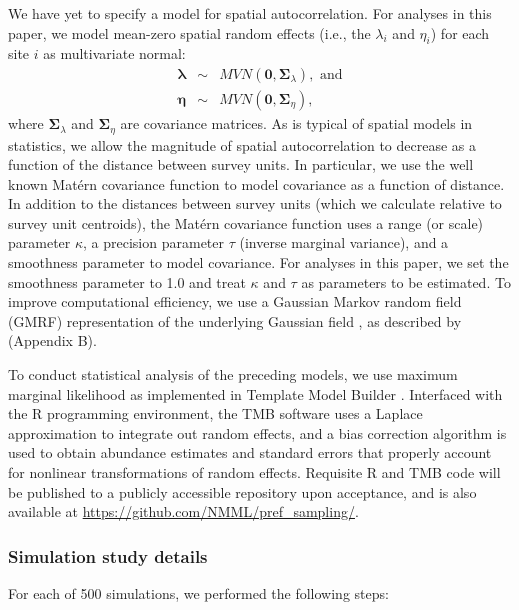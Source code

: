 \documentclass[times,mee,doublespace,]{besauth2}
\begin{document}
\begin{flushleft}
\hspace{0.5in} We have yet to specify a model for spatial autocorrelation.  For analyses in this paper, we model mean-zero spatial random effects (i.e., the $\lambda_i$ and $\eta_i$) for each site $i$ as multivariate normal:
\begin{eqnarray*}
  \boldsymbol{\lambda} & \sim & MVN(\textbf{0},\boldsymbol{\Sigma}_{\lambda}), \text{ and} \\
  \boldsymbol{\eta} & \sim & MVN(\textbf{0},\boldsymbol{\Sigma}_{\eta}),
\end{eqnarray*}
where $\boldsymbol{\Sigma}_{\lambda}$ and $\boldsymbol{\Sigma}_{\eta}$ are covariance matrices.  As is typical of spatial models in statistics, we allow the magnitude of spatial autocorrelation to decrease as a function of the distance between survey units.  In particular, we use the well known Mat\'{e}rn covariance function to model covariance as a function of distance.  In addition to the distances between survey units (which we calculate relative to survey unit centroids), the Mat\'{e}rn covariance function uses a range (or scale) parameter $\kappa$, a precision parameter $\tau$ (inverse marginal variance), and a smoothness parameter to model covariance.  For analyses in this paper, we set the smoothness parameter to 1.0 and treat $\kappa$ and $\tau$ as parameters to be estimated.  To improve computational efficiency, we use a Gaussian Markov random field (GMRF) representation of the underlying Gaussian field \citep{LindgrenEtAl2011}, as described by \citet{ThorsonEtAl2015} (Appendix B).  

To conduct statistical analysis of the preceding models, we use maximum marginal likelihood as implemented in Template Model Builder \citep[TMB; ][]{KristensenEtAl2015}. Interfaced with the R programming environment, the TMB software uses a Laplace approximation to integrate out random effects, and a bias correction algorithm \citep{TierneyEtAl1989,ThorsonKristensenInPress} is used to obtain abundance estimates and standard errors that properly account for nonlinear transformations of random effects.  Requisite R and TMB code will be published to a publicly accessible repository upon acceptance, and is also available at \url{https://github.com/NMML/pref_sampling/}.

\subsubsection*{Simulation study details}

For each of 500 simulations, we performed the following steps:


\end{flushleft}
\end{document}
